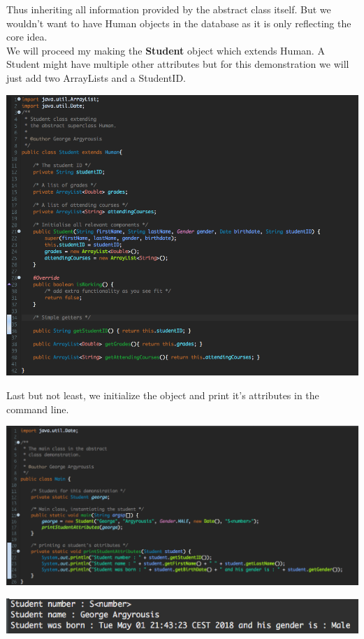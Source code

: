 \documentclass{article}
\begin{document}
            Thus inheriting all information provided by the abstract class itself. But we wouldn't want to have Human objects in the database as it is only reflecting the core idea.\\
            We will proceed my making the \textbf{Student} object which extends Human.
            A Student might have multiple other attributes but for this demonstration we will just add two ArrayLists and a StudentID.

            \includegraphics[scale=0.45]{images/Student_Step2.png}

            Last but not least, we initialize the object and print it's attributes in the command line.

            \includegraphics[scale=0.40]{images/Main_without_error.png}

            \includegraphics[scale=0.71]{images/output.png}
\end{document}
